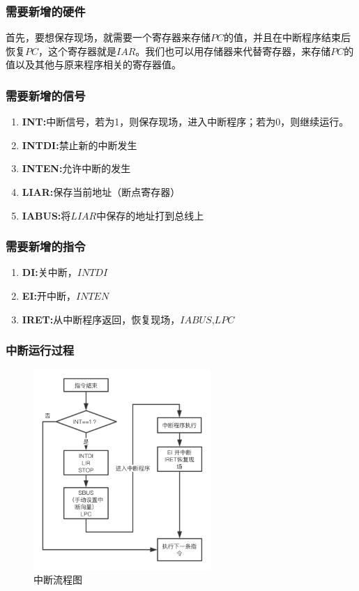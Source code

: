 \documentclass[12pt]{article}
\begin{document}
{        \subsubsection{需要新增的硬件}
        首先，要想保存现场，就需要一个寄存器来存储$PC$的值，并且在中断程序结束后恢复$PC$，这个寄存器就是$IAR$。我们也可以用存储器来代替寄存器，来存储$PC$的值以及其他与原来程序相关的寄存器值。
        
        \subsubsection{需要新增的信号}
        \begin{enumerate}
            \item \textbf{INT:}中断信号，若为1，则保存现场，进入中断程序；若为0，则继续运行。
            \item \textbf{INTDI:}禁止新的中断发生
            \item \textbf{INTEN:}允许中断的发生
            \item \textbf{LIAR:}保存当前地址（断点寄存器）
            \item \textbf{IABUS:}将$LIAR$中保存的地址打到总线上
        \end{enumerate}
        
        \subsubsection{需要新增的指令}
        \begin{enumerate}
            \item \textbf{DI:}关中断，$INTDI$
            \item \textbf{EI:}开中断，$INTEN$
            \item \textbf{IRET:}从中断程序返回，恢复现场，$IABUS$,$LPC$
        \end{enumerate}
        \subsubsection{中断运行过程}
        
        \begin{figure}
            \centering
            \includegraphics[width=0.6\textwidth]{中断流程图.png}
            \caption{中断流程图}
            \label{fig:int}
        \end{figure}
        
}
\end{document}
